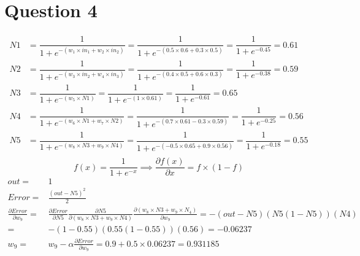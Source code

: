 \documentclass[letter, 10pt]{article}
\begin{document}
\section*{Question 4}
\begin{align*}
    N1 &= \dfrac{1}{1 + e^{-(w_1\times in_1 + w_2\times in_2)}} = \dfrac{1}{1 + e^{-(0.5\times 0.6 + 0.3\times 0.5)}} = \dfrac{1}{1 + e^{-0.45}} = 0.61\\
    N2 &= \dfrac{1}{1 + e^{-(w_3\times in_2 + w_4\times in_3)}} = \dfrac{1}{1 + e^{-(0.4\times 0.5 + 0.6\times 0.3)}} = \dfrac{1}{1 + e^{-0.38}} = 0.59\\
    N3 &= \dfrac{1}{1 + e^{-(w_5\times N1)}} = \dfrac{1}{1 + e^{-(1\times 0.61)}} = \dfrac{1}{1 + e^{-0.61}} = 0.65\\
    N4 &= \dfrac{1}{1 + e^{-(w_6\times N1 + w_7\times N2)}} = \dfrac{1}{1 + e^{-(0.7\times 0.61 - 0.3\times 0.59)}} = \dfrac{1}{1 + e^{-0.25}} = 0.56\\
    N5 &= \dfrac{1}{1 + e^{-(w_8\times N3 + w_9\times N4)}} = \dfrac{1}{1 + e^{-(-0.5\times 0.65 + 0.9\times 0.56)}} = \dfrac{1}{1 + e^{-0.18}} = 0.55\\
\end{align*}
\begin{equation*}
    f(x) = \frac{1}{1+e^{-x}} \implies \frac{\partial f(x)}{\partial x} = f\times(1-f)
\end{equation*}
\begin{align*}
    out =& 1\\
    Error =& \frac{(out - N5)^2}{2}\\
    \frac{\partial Error}{\partial w_9} =& \frac{\partial Error}{\partial N5}\frac{\partial N5}{\partial (w_8\times N3 + w_9\times N4)}\frac{\partial (w_8\times N3 + w_9\times N_4)}{\partial w_9} = -(out-N5)(N5(1-N5))(N4)\\=& -(1-0.55)(0.55(1-0.55))(0.56) = -0.06237\\
    w_9 =& w_9 - \alpha \frac{\partial Error}{\partial w_9} = 0.9 + 0.5\times0.06237 = 0.931185
\end{align*}
\end{document}
